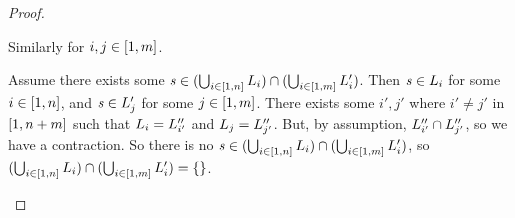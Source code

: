 \documentclass[numbers,10pt,preprint\ifanon ,nocopyrightspace\fi]{sigplanconf}
\begin{document}
\begin{proof}
\begin{case}[$\Leftarrow$]
    Similarly for $i,j\in[1,m]$.

    Assume there exists some $\mathit{s} \in
    (\bigcup_{i\in[1,n]}L_i) \cap
    (\bigcup_{i\in[1,m]}L_i')$.
    Then $\mathit{s}\in L_i$ for some $i\in[1,n]$, and
    $\mathit{s}\in L_j'$ for some $j\in[1,m]$.
    There exists some $i',j'$ where $i' \neq j'$ in $[1,n+m]$
    such that $L_i = L_{i'}''$ and
    $L_j = L_{j'}''$.  But, by assumption,
    $L_{i'}'' \cap L_{j'}''$, so we have a contraction.
    So there is no $\mathit{s} \in (\bigcup_{i\in[1,n]}L_i)
    \cap (\bigcup_{i\in[1,m]}L_i')$, so
    $(\bigcup_{i\in[1,n]}L_i) \cap
    (\bigcup_{i\in[1,m]}L_i') = \{\}$.
  \end{case}
\end{proof}
\end{document}
